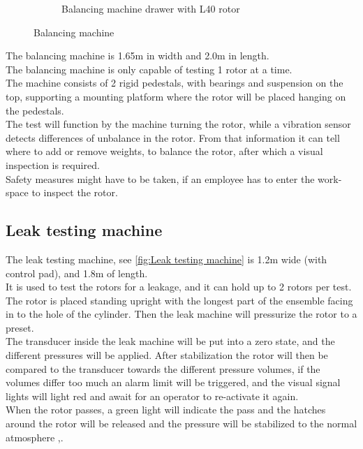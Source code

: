 \begin{figure}[H]
\begin{subfigure}{.49\textwidth}
        \caption{Balancing machine drawer with L40 rotor}
        \label{fig:Rotor} 
    \end{subfigure}
\caption{Balancing machine\cite{Case}}
\label{fig:BalancingMachine}
\end{figure}

The balancing machine is 1.65m in width and 2.0m in length.\\
The balancing machine is only capable of testing 1 rotor at a time.\\
The machine consists of 2 rigid pedestals, with bearings and suspension on the top, supporting a mounting platform where the rotor will be placed hanging on the pedestals.\\
The test will function by the machine turning the rotor, while a vibration sensor detects differences of unbalance in the rotor. From that information it can tell where to add or remove weights, to balance the rotor, after which a visual inspection is required. \\
Safety measures might have to be taken, if an employee has to enter the work-space to inspect the rotor. \\

 \subsection{Leak testing machine}
 
 The leak testing machine, see \ref{fig:Leak testing machine} is 1.2m wide (with control pad), and 1.8m of length.\\ 
 It is used to test the rotors for a leakage, and it can hold up to 2 rotors per test.\\
 The rotor is placed standing upright with the longest part of the ensemble facing in to the hole of the cylinder. Then the leak machine will pressurize the rotor to a preset.\\
 The transducer inside the leak machine will be put into a zero state, and the different pressures will be applied. After stabilization the rotor will then be compared to the transducer towards the different pressure volumes, if the volumes differ too much an alarm limit will be triggered, and the visual signal lights will light red and await for an operator to re-activate it again. \\
 When the rotor passes, a green light will indicate the pass and the hatches around the rotor will be released and the pressure will be stabilized to the normal atmosphere  \cite{LEAK},\cite{LEAK2}. \\

